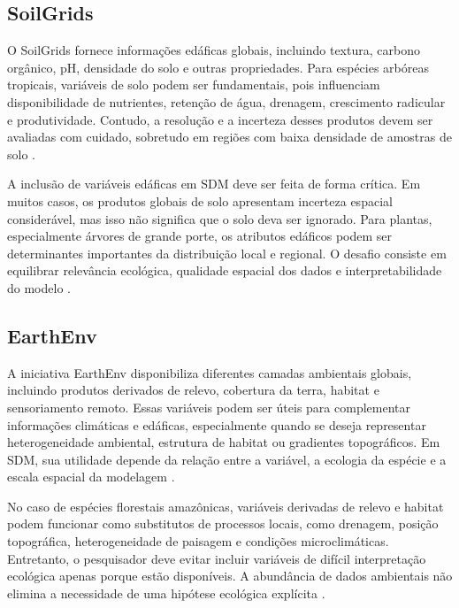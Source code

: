 \subsection{SoilGrids}

O SoilGrids fornece informações edáficas globais, incluindo textura, carbono orgânico, pH, densidade do solo e outras propriedades. Para espécies arbóreas tropicais, variáveis de solo podem ser fundamentais, pois influenciam disponibilidade de nutrientes, retenção de água, drenagem, crescimento radicular e produtividade. Contudo, a resolução e a incerteza desses produtos devem ser avaliadas com cuidado, sobretudo em regiões com baixa densidade de amostras de solo \parencite{poggio2021soilgrids}.

A inclusão de variáveis edáficas em SDM deve ser feita de forma crítica. Em muitos casos, os produtos globais de solo apresentam incerteza espacial considerável, mas isso não significa que o solo deva ser ignorado. Para plantas, especialmente árvores de grande porte, os atributos edáficos podem ser determinantes importantes da distribuição local e regional. O desafio consiste em equilibrar relevância ecológica, qualidade espacial dos dados e interpretabilidade do modelo \parencite{guisan2017habitat,franklin2010mapping}.

\subsection{EarthEnv}

A iniciativa EarthEnv disponibiliza diferentes camadas ambientais globais, incluindo produtos derivados de relevo, cobertura da terra, habitat e sensoriamento remoto. Essas variáveis podem ser úteis para complementar informações climáticas e edáficas, especialmente quando se deseja representar heterogeneidade ambiental, estrutura de habitat ou gradientes topográficos. Em SDM, sua utilidade depende da relação entre a variável, a ecologia da espécie e a escala espacial da modelagem \parencite{tuanmu2014global}.

No caso de espécies florestais amazônicas, variáveis derivadas de relevo e habitat podem funcionar como substitutos de processos locais, como drenagem, posição topográfica, heterogeneidade de paisagem e condições microclimáticas. Entretanto, o pesquisador deve evitar incluir variáveis de difícil interpretação ecológica apenas porque estão disponíveis. A abundância de dados ambientais não elimina a necessidade de uma hipótese ecológica explícita \parencite{elith2009species,zurell2020standard}.

